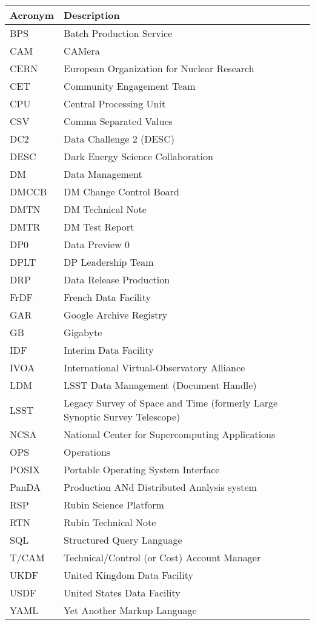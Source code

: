 \addtocounter{table}{-1}
\begin{longtable}{p{}p{}}\hline
\textbf{Acronym} & \textbf{Description}  \\\hline

BPS & Batch Production Service \\\hline
CAM & CAMera \\\hline
CERN & European Organization for Nuclear Research \\\hline
CET & Community Engagement Team \\\hline
CPU & Central Processing Unit \\\hline
CSV & Comma Separated Values \\\hline
DC2 & Data Challenge 2 (DESC) \\\hline
DESC & Dark Energy Science Collaboration \\\hline
DM & Data Management \\\hline
DMCCB & DM Change Control Board \\\hline
DMTN & DM Technical Note \\\hline
DMTR & DM Test Report \\\hline
DP0 & Data Preview 0 \\\hline
DPLT & DP Leadership Team \\\hline
DRP & Data Release Production \\\hline
FrDF & French Data Facility \\\hline
GAR & Google Archive Registry \\\hline
GB & Gigabyte \\\hline
IDF & Interim Data Facility \\\hline
IVOA & International Virtual-Observatory Alliance \\\hline
LDM & LSST Data Management (Document Handle) \\\hline
LSST & Legacy Survey of Space and Time (formerly Large Synoptic Survey Telescope) \\\hline
NCSA & National Center for Supercomputing Applications \\\hline
OPS & Operations \\\hline
POSIX & Portable Operating System Interface \\\hline
PanDA &  Production ANd Distributed Analysis system \\\hline
RSP & Rubin Science Platform \\\hline
RTN & Rubin Technical Note \\\hline
SQL & Structured Query Language \\\hline
T/CAM & Technical/Control (or Cost) Account Manager \\\hline
UKDF & United Kingdom Data Facility \\\hline
USDF & United States Data Facility \\\hline
YAML & Yet Another Markup Language \\\hline
\end{longtable}
